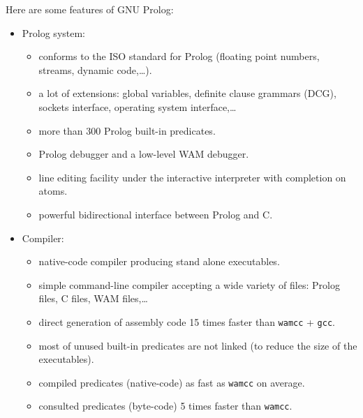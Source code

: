 Here are some features of GNU Prolog:

\begin{itemize}


\item Prolog system:

\begin{itemize}

\item conforms to the ISO standard for Prolog (floating point numbers,
streams, dynamic code,\dots).

\item a lot of extensions: global variables, definite clause grammars (DCG),
sockets interface, operating system interface,\ldots

\item more than 300 Prolog built-in predicates.

\item Prolog debugger and a low-level WAM debugger.

\item line editing facility under the interactive interpreter with
completion on atoms.

\item powerful bidirectional interface between Prolog and C.

\end{itemize}


\item Compiler:

\begin{itemize}

\item native-code compiler producing stand alone executables.

\item simple command-line compiler accepting a wide variety of files:
Prolog files, C files, WAM files,\ldots

\item direct generation of assembly code 15 times faster than
\texttt{wamcc} + \texttt{gcc}.

\item most of unused built-in predicates are not linked (to reduce the size
of the executables).

\item compiled predicates (native-code) as fast as \texttt{wamcc} on average.

\item consulted predicates (byte-code) 5 times faster than \texttt{wamcc}.


\end{itemize}
\end{itemize}
